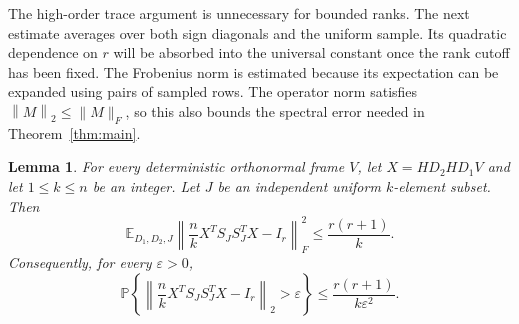 \documentclass[11pt]{article}
\newtheorem{lemma}[theorem]{Lemma}
\theoremstyle{definition}
\theoremstyle{remark}
\theoremstyle{plain}
\newcommand{\E}{\mathbb E}
\newcommand{\Prob}{\mathbb P}
\newcommand{\norm}[1]{\left\lVert#1\right\rVert_2}
\begin{document}
The high-order trace argument is unnecessary for bounded ranks.
The next estimate averages over both sign diagonals and the uniform
sample. Its quadratic dependence on $r$ will be absorbed into the
universal constant once the rank cutoff has been fixed. The
Frobenius norm is estimated because its
expectation can be expanded using pairs of sampled rows. The operator
norm satisfies $\norm{M}\le\|M\|_F$, so this also bounds the
spectral error needed in Theorem~\ref{thm:main}.

\begin{lemma}\label{lem:small}
For every deterministic orthonormal frame \(V\), let \(X=HD_2HD_1V\)
and let $1\le k\le n$ be an integer. Let \(J\) be an independent
uniform \(k\)-element subset. Then
\begin{equation}\label{eq:small-rank-moment}
 \E_{D_1,D_2,J}\left\|\frac nkX^TS_JS_J^TX-I_r\right\|_F^2
                                      \le\frac{r(r+1)}k.
\end{equation}
Consequently, for every $\varepsilon>0$,
\begin{equation}\label{eq:small-rank-tail}
 \Prob\left\{\norm{\frac nkX^TS_JS_J^TX-I_r}>\varepsilon\right\}
       \le\frac{r(r+1)}{k\varepsilon^2}.
\end{equation}
\end{lemma}
\end{document}

